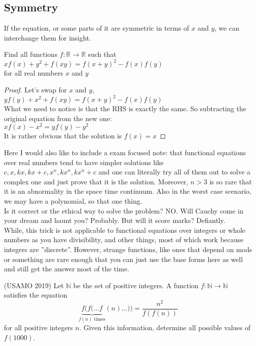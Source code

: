 \subsection{Symmetry}
If the equation, or some parts of it are symmetric in terms of $x$ and $y$, we can interchange them for insight.
\begin{example}
Find all functions $f : \mathbb{R} \to \mathbb{R}$ such that\\
$xf(x) + y^2 + f(xy) = f(x + y)^2 - f(x)f(y)$\\
for all real numbers $x$ and $y$
\end{example}
\begin{proof}
    Let's swap for $x$ and $y$,\\
    $yf(y) + x^2 + f(xy) = f(x + y)^2 - f(x)f(y)$\\
What we need to notice is that the RHS is exactly the same. So subtracting the original equation from the new one:\\
$xf(x)-x^2=yf(y)-y^2$\\
It is rather obvious that the solution is $f(x)=x$
\end{proof}
Here I would also like to include a exam focused note: that functional equations over real numbers tend to have simpler solutions like $c, x, kx, kx+c, x^n, kx^n, kx^n+c$ and one can literally try all of them out to solve a complex one and just prove that it is the solution. Moreover, $n > 3$ is so rare that it is an abnormality in the space time continuum. Also in the worst case scenario, we may have a polynomial, so that one thing.\\
Is it correct or the ethical way to solve the problem? NO. Will Cauchy come in your dream and haunt you? Probably. But will it score marks? Defiantly.\\
While, this trick is not applicable to functional equations over integers or whole numbers as you have divisibility, and other things, most of which work because integers are ”discrete”. However,  strange functions, like ones that depend on mods or something are rare enough that you can just use the base forms here as well and still get the answer most of the time.\\
\begin{example}
(USAMO 2019)
    Let $\mathbb{N}$ be the set of positive integers. A function $f:\mathbb{N}\to\mathbb{N}$ satisfies the equation\[\underbrace{f(f(\ldots f}_{f(n)\text{ times}}(n)\ldots))=\frac{n^2}{f(f(n))}\]for all positive integers $n$. Given this information, determine all possible values of $f(1000)$.
\end{example}
